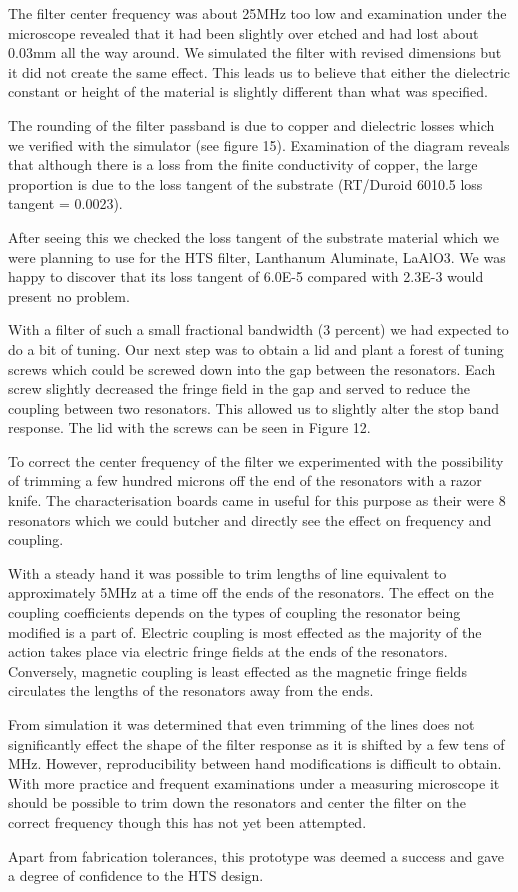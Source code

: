 The filter center frequency was about 25MHz too low and examination under the microscope revealed that it had been slightly over etched and had lost about 0.03mm all the way around. We simulated the filter with revised dimensions but it did not create the same effect. This leads us to believe that either the dielectric constant or height of the material is slightly different than what was specified. 

The rounding of the filter passband is due to copper and dielectric losses which we verified with the simulator (see figure 15). Examination of the diagram reveals that although there is a loss from the finite conductivity of copper, the large proportion is due to the loss tangent of the substrate (RT/Duroid 6010.5 loss tangent = 0.0023).

After seeing this we checked the loss tangent of the substrate material which we were planning to use for the HTS filter, Lanthanum Aluminate, LaAlO3. We was happy to discover that its loss tangent of 6.0E-5 compared with 2.3E-3 would present no problem.

With a filter of such a small fractional bandwidth (3 percent) we had expected to do a bit of tuning. Our next step was to obtain a lid and plant a forest of tuning screws which could be screwed down into the gap between the resonators. Each screw slightly decreased the fringe field in the gap and served to reduce the coupling between two resonators. This allowed us to slightly alter the stop band response. The lid with the screws can be seen in Figure 12.

To correct the center frequency of the filter we experimented with the possibility of trimming a few hundred microns off the end of the resonators with a razor knife. The characterisation boards came in useful for this purpose as their were 8 resonators which we could butcher and directly see the effect on frequency and coupling. 

With a steady hand it was possible to trim lengths of line equivalent to approximately 5MHz at a time off the ends of the resonators. The effect on the coupling coefficients depends on the types of coupling the resonator being modified is a part of. Electric coupling is most effected as the majority of the action takes place via electric fringe fields at the ends of the resonators. Conversely, magnetic coupling is least effected as the magnetic fringe fields circulates the lengths of the resonators away from the ends.

From simulation it was determined that even trimming of the lines does not significantly effect the shape of the filter response as it is shifted by a few tens of MHz. However, reproducibility between hand modifications is difficult to obtain. With more practice and frequent examinations under a measuring microscope it should be possible to trim down the resonators and center the filter on the correct frequency though this has not yet been attempted.

Apart from fabrication tolerances, this prototype was deemed a success and gave a degree of confidence to the HTS design.
